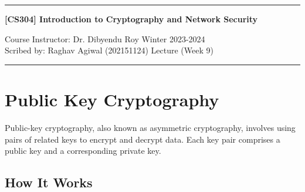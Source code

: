 \documentclass[11pt]{article}
\begin{document}
\noindent
\rule{\textwidth}{1pt}
\begin{center}
{\bf [CS304] Introduction to Cryptography and Network Security}
\end{center}
Course Instructor: Dr. Dibyendu Roy \hfill Winter 2023-2024\\
Scribed by: Raghav Agiwal (202151124) \hfill Lecture (Week 9)
\\
\rule{\textwidth}{1pt}


\section{Public Key Cryptography}

Public-key cryptography, also known as asymmetric cryptography, involves using pairs of related keys to encrypt and decrypt data. Each key pair comprises a public key and a corresponding private key.

\subsection*{How It Works}
\end{document}

